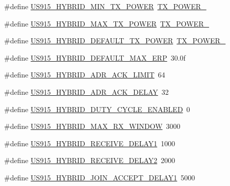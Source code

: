 \begin{DoxyCompactItemize}
\#define \hyperlink{group__REGIONUS915HYB_ga0aece8c836bf5bf19a28589cb3cda70e}{U\+S915\+\_\+\+H\+Y\+B\+R\+I\+D\+\_\+\+M\+I\+N\+\_\+\+T\+X\+\_\+\+P\+O\+W\+ER}~\hyperlink{group__REGION_gac9747c69350f34d485c3134e5a57655b}{T\+X\+\_\+\+P\+O\+W\+E\+R\+\_}
\item 
\#define \hyperlink{group__REGIONUS915HYB_ga94a1ed1e5cca1f05f0ac4916e164f529}{U\+S915\+\_\+\+H\+Y\+B\+R\+I\+D\+\_\+\+M\+A\+X\+\_\+\+T\+X\+\_\+\+P\+O\+W\+ER}~\hyperlink{group__REGION_gab33618449f2a573142c463ab071ef8ed}{T\+X\+\_\+\+P\+O\+W\+E\+R\+\_}
\item 
\#define \hyperlink{group__REGIONUS915HYB_gac33efe45e6e9b5ac53a97b4ed314c28e}{U\+S915\+\_\+\+H\+Y\+B\+R\+I\+D\+\_\+\+D\+E\+F\+A\+U\+L\+T\+\_\+\+T\+X\+\_\+\+P\+O\+W\+ER}~\hyperlink{group__REGION_gab33618449f2a573142c463ab071ef8ed}{T\+X\+\_\+\+P\+O\+W\+E\+R\+\_}
\item 
\#define \hyperlink{group__REGIONUS915HYB_gac045f9e8230d0740b4676fbade801432}{U\+S915\+\_\+\+H\+Y\+B\+R\+I\+D\+\_\+\+D\+E\+F\+A\+U\+L\+T\+\_\+\+M\+A\+X\+\_\+\+E\+RP}~30.\+0f
\item 
\#define \hyperlink{group__REGIONUS915HYB_ga1a479117e6e72786f00838f96288ecfd}{U\+S915\+\_\+\+H\+Y\+B\+R\+I\+D\+\_\+\+A\+D\+R\+\_\+\+A\+C\+K\+\_\+\+L\+I\+M\+IT}~64
\item 
\#define \hyperlink{group__REGIONUS915HYB_gad0a445c397f7510c7ebdca13b5197389}{U\+S915\+\_\+\+H\+Y\+B\+R\+I\+D\+\_\+\+A\+D\+R\+\_\+\+A\+C\+K\+\_\+\+D\+E\+L\+AY}~32
\item 
\#define \hyperlink{group__REGIONUS915HYB_ga7d99e44bc983c9f9e453640cc13712bf}{U\+S915\+\_\+\+H\+Y\+B\+R\+I\+D\+\_\+\+D\+U\+T\+Y\+\_\+\+C\+Y\+C\+L\+E\+\_\+\+E\+N\+A\+B\+L\+ED}~0
\item 
\#define \hyperlink{group__REGIONUS915HYB_ga1420db342d8dc812b2d4f033df8d2a9c}{U\+S915\+\_\+\+H\+Y\+B\+R\+I\+D\+\_\+\+M\+A\+X\+\_\+\+R\+X\+\_\+\+W\+I\+N\+D\+OW}~3000
\item 
\#define \hyperlink{group__REGIONUS915HYB_ga7f976c7a9c51b01109f0b18c9c9d14a7}{U\+S915\+\_\+\+H\+Y\+B\+R\+I\+D\+\_\+\+R\+E\+C\+E\+I\+V\+E\+\_\+\+D\+E\+L\+A\+Y1}~1000
\item 
\#define \hyperlink{group__REGIONUS915HYB_ga253fc685fda5fcc97f80f92be8d5fcf2}{U\+S915\+\_\+\+H\+Y\+B\+R\+I\+D\+\_\+\+R\+E\+C\+E\+I\+V\+E\+\_\+\+D\+E\+L\+A\+Y2}~2000
\item 
\#define \hyperlink{group__REGIONUS915HYB_ga4c1ae5c7dd6fb04bb0275959d38e3bb6}{U\+S915\+\_\+\+H\+Y\+B\+R\+I\+D\+\_\+\+J\+O\+I\+N\+\_\+\+A\+C\+C\+E\+P\+T\+\_\+\+D\+E\+L\+A\+Y1}~5000
\item 

\end{DoxyCompactItemize}
